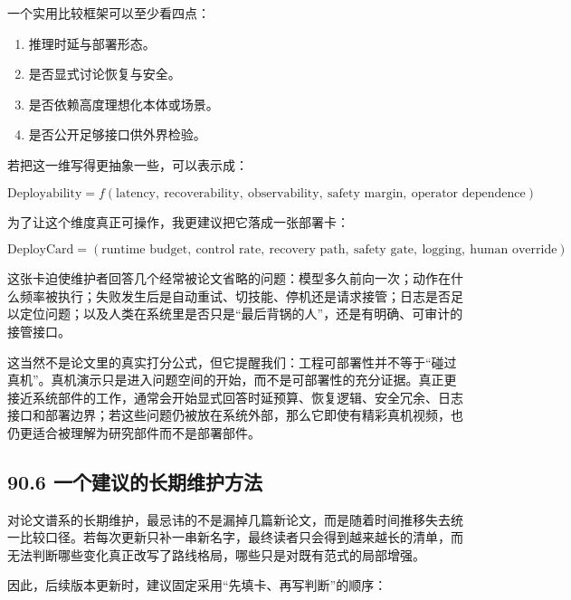 一个实用比较框架可以至少看四点：

\begin{enumerate}
\item 推理时延与部署形态。
\item 是否显式讨论恢复与安全。
\item 是否依赖高度理想化本体或场景。
\item 是否公开足够接口供外界检验。
\end{enumerate}

若把这一维写得更抽象一些，可以表示成：

\begingroup
\scriptsize
\begin{equation*}
\text{Deployability}=f(\text{latency},\ \text{recoverability},\ \text{observability},\ \text{safety margin},\ \text{operator dependence})
\end{equation*}
\endgroup

为了让这个维度真正可操作，我更建议把它落成一张部署卡：

\begingroup
\scriptsize
\begin{equation*}
\text{DeployCard}=(\text{runtime budget},\ \text{control rate},\ \text{recovery path},\ \text{safety gate},\ \text{logging},\ \text{human override})
\end{equation*}
\endgroup

这张卡迫使维护者回答几个经常被论文省略的问题：模型多久前向一次；动作在什么频率被执行；失败发生后是自动重试、切技能、停机还是请求接管；日志是否足以定位问题；以及人类在系统里是否只是“最后背锅的人”，还是有明确、可审计的接管接口。

这当然不是论文里的真实打分公式，但它提醒我们：工程可部署性并不等于“碰过真机”。真机演示只是进入问题空间的开始，而不是可部署性的充分证据。真正更接近系统部件的工作，通常会开始显式回答时延预算、恢复逻辑、安全冗余、日志接口和部署边界；若这些问题仍被放在系统外部，那么它即使有精彩真机视频，也仍更适合被理解为研究部件而不是部署部件。

\subsection*{90.6 一个建议的长期维护方法}


对论文谱系的长期维护，最忌讳的不是漏掉几篇新论文，而是随着时间推移失去统一比较口径。若每次更新只补一串新名字，最终读者只会得到越来越长的清单，而无法判断哪些变化真正改写了路线格局，哪些只是对既有范式的局部增强。

因此，后续版本更新时，建议固定采用“先填卡、再写判断”的顺序：

